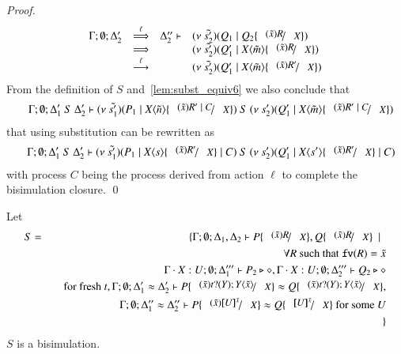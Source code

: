 \begin{proof}
%
\[
	\begin{array}{rcll}
		\Gamma; \es; \Delta_2' &\By{\ell}& \Delta_2'' \proves &
		\newsp{\tilde{s_2'}}{Q_1 \Par Q_2 \subst{(\tilde{x}) R}{X}}\\
		&\By{}& &
		\newsp{\tilde{s_2'}}{Q_1' \Par \appl{X}{\tilde{m}} \subst{(\tilde{x}) R}{X}} \\
		&\by{\ell}& &
		\newsp{\tilde{s_2'}}{Q_1' \Par \appl{X}{\tilde{m}} \subst{(\tilde{x}) R'}{X}} \\
	\end{array}
\]
%
	\noi From the definition of $S$ and~\ref{lem:subst_equiv6}
	we also conclude that
	\begin{eqnarray*}
		&&\Gamma; \es; \Delta_1'\ S\ \Delta_2' \proves 
		\newsp{\tilde{s_1'}}{P_1 \Par \appl{X}{\tilde{n}} \subst{(\tilde{x}) R' \Par C}{X}}\ S\ \newsp{s_2'}{Q_1' \Par \appl{X}{\tilde{m}} \subst{(\tilde{x}) R' \Par C}{X}}
	\end{eqnarray*}
	\noi that using substitution can be rewritten as
	\begin{eqnarray*}
		&&\Gamma; \es; \Delta_1'\ S\ \Delta_2' \proves 
		\newsp{\tilde{s_1'}}{P_1 \Par \appl{X}{s} \subst{(\tilde{x}) R'}{X} \Par C}\ S\ \newsp{s_2'}{Q_1' \Par \appl{X}{s'} \subst{(\tilde{x}) R'}{X} \Par C}
	\end{eqnarray*}
	\noi with process $C$ being the process derived from action $\ell$
	to complete the bisimulation closure.
	\qed
\end{proof}

\begin{corollary}\rm
	\label{cor:subst_equiv}
	Let
	\begin{eqnarray*}
		S &=& \set{ \Gamma; \es; \Delta_1, \Delta_2 \proves P \subst{(\tilde{x}) R}{X}, Q \subst{(\tilde{x}) R}{X} \setbar \\
		&& \quad \forall R \textrm{ such that } \fv{R} = \tilde{x}\\
		&& \quad \Gamma \cat X: U; \es;\Delta_1''' \proves P_2 \hastype \Proc, \Gamma \cat X: U; \es; \Delta_2''' \proves Q_2 \hastype \Proc\\
		&& \quad \textrm{for fresh } t,  \Gamma; \es; \Delta_1' \wb \Delta_2' \proves P \subst{(\tilde{x}) \binp{t}{Y} \appl{Y}{\tilde{x}}}{X} \wb Q \subst{(\tilde{x}) \binp{t}{Y} \appl{Y}{\tilde{x}}}{X}, \\
		&& \quad \Gamma; \es; \Delta_1'' \wb \Delta_2'' \proves P \subst{(\tilde{x}) \map{U}^{\tilde{x}}}{X} \wb Q \subst{\map{U}^{\tilde{x}}}{X} \textrm{ for some } U \\
		&&}
	\end{eqnarray*}
	$S$ is a bisimulation.
\end{corollary}

